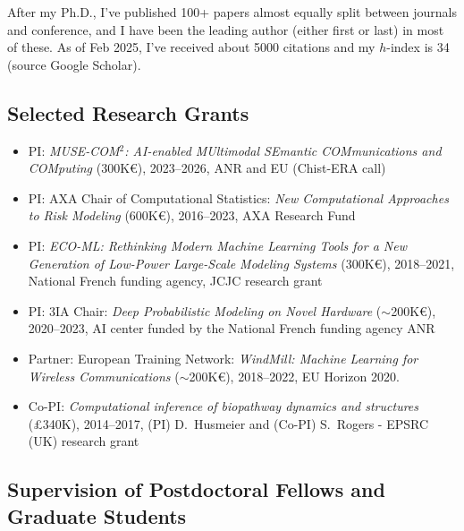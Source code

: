 \documentclass[oneside, a4paper, onecolumn, 10pt]{article}
\begin{document}
After my Ph.D., I've published 100+ papers almost equally split between journals and conference, and I have been the leading author (either first or last) in most of these.
As of Feb 2025, I've received about 5000 citations and my $h$-index is 34 (source Google Scholar).

\subsection*{Selected Research Grants}
\begin{itemize}
  \item PI: \emph{MUSE-COM$^2$: AI-enabled MUltimodal SEmantic COMmunications and COMputing} (300K\euro), 2023--2026, ANR and EU (Chist-ERA call)
  \item PI: AXA Chair of Computational Statistics: \emph{New Computational Approaches to Risk Modeling} (600K\euro), 2016--2023, AXA Research Fund 
  \item PI: \emph{ECO-ML: Rethinking Modern Machine Learning Tools for a New Generation of Low-Power Large-Scale Modeling Systems} (300K\euro), 2018--2021, National French funding agency, JCJC research grant
  \item PI: 3IA Chair: \emph{Deep Probabilistic Modeling on Novel Hardware} ($\sim$200K\euro), 2020--2023, AI center funded by the National French funding agency ANR
  \item Partner: European Training Network: \emph{WindMill: Machine Learning for Wireless Communications} ($\sim$200K\euro), 2018--2022, EU Horizon 2020.
  \item Co-PI: \emph{Computational inference of biopathway dynamics and structures} (\pounds 340K), 2014--2017, (PI) D.~Husmeier and (Co-PI) S.~Rogers - EPSRC (UK) research grant 
\end{itemize}



\subsection*{Supervision of Postdoctoral Fellows and Graduate Students}
\end{document}
